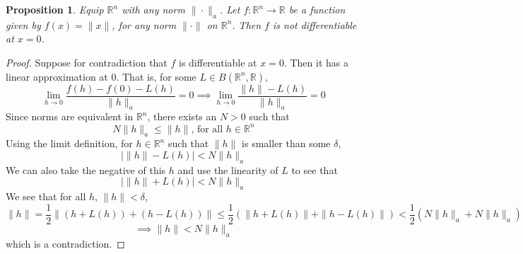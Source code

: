 \documentclass{article}
\theoremstyle{plain} %
\numberwithin{thm}{section} %
\newtheorem{prop}[thm]{Proposition}
\theoremstyle{definition}
\begin{document}
    \begin{prop}
        Equip \(\mathbb{R}^n\) with any norm \(\|\cdot\| _a\). Let \(f : \mathbb{R}^n \to \mathbb{R}\) be a function given by \(f(x) = \|x\|\), for any norm \(\|\cdot\|\) on \(\mathbb{R}^n\). Then \(f\) is not differentiable at \(x=0\).
    \end{prop}
    \begin{proof}
        Suppose for contradiction that \(f\) is differentiable at \(x=0\). Then it has a linear approximation at \(0\). That is, for some \(L \in B(\mathbb{R}^n, \mathbb{R})\),
        \[
            \lim_{h \to 0} \frac{f(h) - f(0) - L(h)}{\|h\| _a} = 0 \implies \lim_{h \to 0} \frac{\|h\| - L(h)}{\|h\| _a} = 0
        \]
        Since norms are equivalent in \(\mathbb{R}^n\), there exists an \(N > 0\) such that
        \[
            N\|h\| _a \leq \|h\| \text{, for all } h \in \mathbb{R}^n
        \]
        Using the limit definition, for \(h \in \mathbb{R}^n\) such that \(\|h\|\) is smaller than some \(\delta\),
        \[
            \left\vert \|h\| - L(h) \right\vert < N\|h\| _a
        \]
        We can also take the negative of this \(h\) and use the linearity of \(L\) to see that
        \[
            \left\vert \|h\| + L(h) \right\vert < N\|h\| _a
        \]
        We see that for all \(h\), \(\|h\| <\delta\),
        \[
            \|h\| = \frac{1}{2} \|(h + L(h)) + (h - L(h))\| \leq \frac{1}{2} \left(\|h + L(h)\| + \|h - L(h)\|\right) < \frac{1}{2} (N \|h\| _a + N \|h\| _a)
        \]
        \[
            \implies \|h\| < N\|h\| _a
        \]
        which is a contradiction.
        \smallbreak
    \end{proof}
\end{document}

